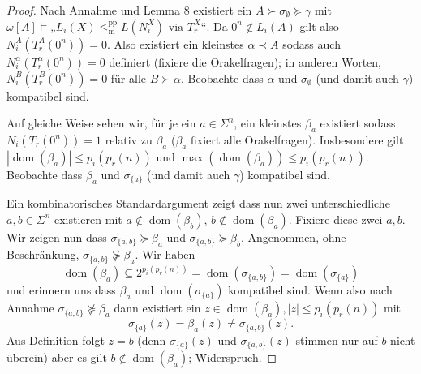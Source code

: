 \documentclass[nofonts]{uebung}
\DeclareMathOperator{\dom}{dom}
\def\leqmpp{\ensuremath{\leq_\mathrm{m}^\mathrm{pp}}}
\begin{document}
\begin{proof}
    Nach Annahme und Lemma 8 existiert ein $A\succ\sigma_\emptyset\succeq \gamma$ mit $\omega[A] \vDash „L_{i}(X)\leqmpp L(N_i^X)\text{ via }T^X_r“$.
    Da $0^n\not\in L_i(A)$ gilt also $N^A_i(T_r^A(0^n))=0$.
    Also existiert ein kleinstes $\alpha\prec A$ sodass auch $N^\alpha_i(T_r^\alpha(0^n))=0$ definiert (fixiere die Orakelfragen); in anderen Worten, $N^B_i(T_r^B(0^n))=0$ für alle $B\succ\alpha$.
    Beobachte dass $\alpha$ und $\sigma_\emptyset$ (und damit auch $\gamma$) kompatibel sind.

    Auf gleiche Weise sehen wir, für je ein $a\in\Sigma^n$, ein kleinstes $\beta_a$ existiert sodass $N_i(T_r(0^n))=1$ relativ zu $\beta_a$ ($\beta_a$ fixiert alle Orakelfragen). Insbesondere gilt $|\dom(\beta_a)|\leq p_i(p_r(n))$ und $\max(\dom(\beta_a)) \leq p_i(p_r(n))$.
    Beobachte dass $\beta_a$ und $\sigma_{\{a\}}$ (und damit auch $\gamma$) kompatibel sind.

    Ein kombinatorisches Standardargument zeigt dass nun zwei unterschiedliche $a,b\in \Sigma^n$ existieren mit $a\not\in \dom(\beta_b)$, $b\not\in \dom(\beta_a)$. Fixiere diese zwei $a,b$.
    Wir zeigen nun dass $\sigma_{\{a,b\}} \succeq \beta_a$ und $\sigma_{\{a,b\}} \succeq \beta_b$.
    Angenommen, ohne Beschränkung, $\sigma_{\{a,b\}} \not\succeq \beta_a$.
    Wir haben \[ \dom(\beta_a)\subseteq 2^{p_i(p_r(n))} =\dom(\sigma_{\{a,b\}})=\dom(\sigma_{\{a\}}) \]
    und erinnern uns dass $\beta_a$ und $\dom(\sigma_{\{a\}})$ kompatibel sind.
    Wenn also nach Annahme $\sigma_{\{a,b\}} \not\succeq \beta_a$ dann existiert ein $z\in\dom(\beta_a), |z|\leq p_i(p_r(n))$ mit
    \[ \sigma_{\{a\}}(z)=\beta_a(z)\neq \sigma_{\{a,b\}}(z). \]
    Aus Definition folgt $z=b$ (denn $\sigma_{\{a\}}(z)$ und $\sigma_{\{a,b\}}(z)$ stimmen nur auf $b$ nicht überein)
    aber es gilt $b\not\in\dom(\beta_a)$; Widerspruch.


\end{proof}
\end{document}
